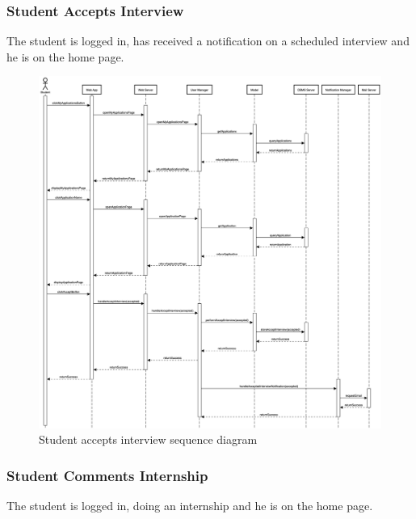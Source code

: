 \newpage
\subsubsection{Student Accepts Interview}
The student is logged in, has received a notification on a scheduled interview and he is on the home page.

\begin{figure}[h]
    \centering
    \includegraphics[width=16cm]{images/sequence-diagrams/student-accepts-interview.png}
    \caption{Student accepts interview sequence diagram}
\end{figure}

\newpage
\subsubsection{Student Comments Internship}
The student is logged in, doing an internship and he is on the home page.

